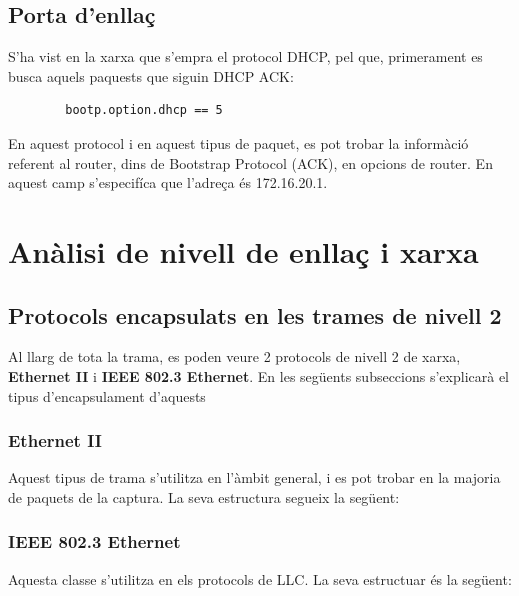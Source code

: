 \documentclass{article}
\begin{document}
\subsection{Porta d'enllaç}
S'ha vist en la xarxa que s'empra el protocol DHCP, pel que, primerament
es busca aquels paquests que siguin DHCP ACK:\\
\begin{lstlisting}
		bootp.option.dhcp == 5
\end{lstlisting}
En aquest protocol i en aquest tipus de paquet, es pot trobar la informàció
referent al router,  dins de Bootstrap Protocol (ACK), en opcions de router.
En aquest camp s'especifíca que l'adreça és 172.16.20.1.
\section{Anàlisi de nivell de enllaç i xarxa}
\subsection{Protocols encapsulats en les trames de nivell 2}
Al llarg de tota la trama, es poden veure 2 protocols de nivell 2 de
xarxa, \textbf{Ethernet II} i \textbf{IEEE 802.3 Ethernet}. En les següents
subseccions s'explicarà el tipus d'encapsulament d'aquests
\subsubsection{Ethernet II}
Aquest tipus de trama s'utilitza en l'àmbit general, i es pot trobar en la majoria
de paquets de la captura. La seva estructura segueix la següent:\\
\subsubsection{IEEE 802.3 Ethernet}
Aquesta classe s'utilitza en els protocols de LLC. La seva estructuar és la
següent:
\end{document}
